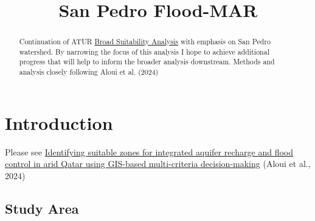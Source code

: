 \documentclass[
]{agujournal2019}
\begin{document}
\title{San Pedro Flood-MAR}



\begin{abstract}
Continuation of ATUR
\href{https://travisz09.github.io/ATUR-Broad-Suitability-Analysis/}{Broad
Suitability Analysis} with emphasis on San Pedro watershed. By narrowing
the focus of this analysis I hope to achieve additional progress that
will help to inform the broader analysis downstream. Methods and
analysis closely following Aloui et al. (2024)
\end{abstract}





\section{Introduction}\label{introduction}

Please see
\href{https://www.sciencedirect.com/science/article/pii/S2352801X24000602\#bib49}{Identifying
suitable zones for integrated aquifer recharge and flood control in arid
Qatar using GIS-based multi-criteria decision-making} (Aloui et al.,
2024)

\subsection{Study Area}\label{study-area}
\end{document}
